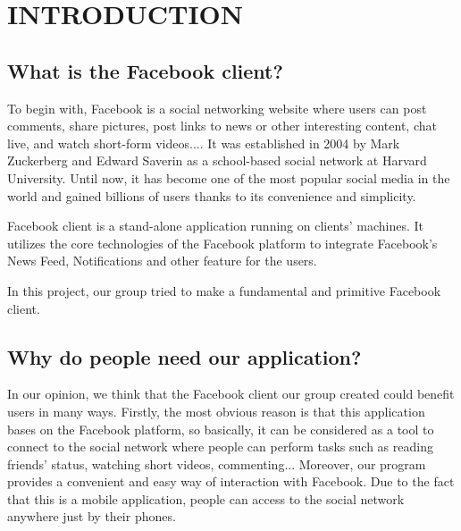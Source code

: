 \newpage
\vspace{6cm}
\section{INTRODUCTION}
\subsection{What is the Facebook client?}
\hspace{0.7cm}To begin with, Facebook is a social networking website where users can post comments, share pictures, post links to news or other interesting content, chat live, and watch short-form videos.... It was established in 2004 by Mark Zuckerberg and Edward Saverin as a school-based social network at Harvard University. Until now, it has become one of the most popular social media in the world and gained billions of users thanks to its convenience and simplicity.

\vspace{0.7cm}Facebook client is a stand-alone application running on clients’ machines.	It utilizes the core technologies of the Facebook platform to integrate Facebook’s News Feed, Notifications and other feature for the users.

\vspace{0.7cm}In this project, our group tried to make a fundamental and primitive Facebook client. 

\subsection{Why do people need our application?}
\hspace{0.7cm}In our opinion, we think that the Facebook client our group created could benefit users in many ways. Firstly, the most obvious reason is that this application bases on the Facebook platform, so basically, it can be considered as a tool to connect to the social network where people can perform tasks such as reading friends’ status, watching short videos, commenting... Moreover, our program provides a convenient and easy way of interaction with Facebook. Due to the fact that this is a mobile application, people can access to the social network anywhere just by their phones.